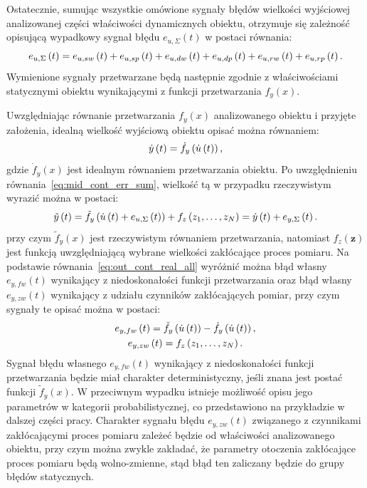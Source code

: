 Ostatecznie, sumując wszystkie omówione sygnały błędów wielkości wyjściowej analizowanej części właściwości dynamicznych obiektu, otrzymuje się zależność opisującą wypadkowy sygnał błędu $e_{u,\Sigma}(t)$ w postaci równania:
\begin{equation}
e_{u,\Sigma} \left(t\right) = e_{u,sw} \left(t\right) + e_{u,sp} \left(t\right) + e_{u,dw} \left(t\right) + e_{u,dp} \left(t\right) + e_{u,rw} \left(t\right) + e_{u,rp} \left(t\right) \label{eq:mid_cont_err_sum}.
\end{equation}
Wymienione sygnały przetwarzane będą następnie zgodnie z właściwościami statycznymi obiektu wynikającymi z funkcji przetwarzania $f_{y}(x)$.

Uwzględniając równanie przetwarzania $f_{y}(x)$ analizowanego obiektu i przyjęte założenia, idealną wielkość wyjściową obiektu opisać można równaniem:
\begin{equation}
\dot{y} \left(t\right) = \dot{f}_{y} \left( \dot{u} \left(t\right) \right) \label{eq:out_cont_ideal_all},
\end{equation}
gdzie $\dot{f}_{y}(x)$ jest idealnym równaniem przetwarzania obiektu. Po uwzględnieniu równania~\eqref{eq:mid_cont_err_sum}, wielkość tą w przypadku rzeczywistym wyrazić można w postaci:
\begin{equation}
\tilde{y} \left(t\right) = \tilde{f}_{y} \left( \dot{u} \left(t\right) + e_{u,\Sigma} \left(t\right) \right) + f_{z} \left( z_{1}, \hdots, z_{N} \right) = \dot{y} \left(t\right) + e_{y,\Sigma} \left(t\right) \label{eq:out_cont_real_all}.
\end{equation}
przy czym $\tilde{f}_{y}(x)$ jest rzeczywistym równaniem przetwarzania, natomiast $f_{z}(\mathbf{z})$ jest funkcją uwzględniającą wybrane wielkości zakłócające proces pomiaru. Na podstawie równania~\eqref{eq:out_cont_real_all} wyróżnić można błąd własny $e_{y,fw}(t)$ wynikający z niedoskonałości funkcji przetwarzania oraz błąd własny $e_{y,zw}(t)$ wynikający z udziału czynników zakłócających pomiar, przy czym sygnały te opisać można w postaci:
\begin{gather}
e_{y,fw} \left(t\right) = \tilde{f}_{y} \left( \dot{u} \left(t\right) \right) - \dot{f}_{y} \left( \dot{u} \left(t\right) \right) \label{eq:out_cont_err_funct_self}, \\
e_{y,zw} \left(t\right) = f_{z} \left( z_{1}, \hdots, z_{N} \right) \label{eq:out_cont_err_env_self}.
\end{gather}
Sygnał błędu własnego $e_{y,fw}(t)$ wynikający z niedoskonałości funkcji przetwarzania będzie miał charakter deterministyczny, jeśli znana jest postać funkcji $\tilde{f}_{y}(x)$. W przeciwnym wypadku istnieje możliwość opisu jego parametrów w kategorii probabilistycznej, co przedstawiono na przykładzie w dalszej części pracy. Charakter sygnału błędu $e_{y,zw}(t)$ związanego z czynnikami zakłócającymi proces pomiaru zależeć będzie od właściwości analizowanego obiektu, przy czym można zwykle zakładać, że parametry otoczenia zakłócające proces pomiaru będą wolno-zmienne, stąd błąd ten zaliczany będzie do grupy błędów statycznych.

